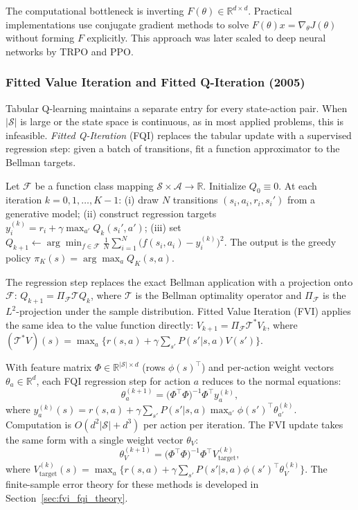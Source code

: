 The computational bottleneck is inverting $F(\theta) \in \mathbb{R}^{d \times d}$. Practical implementations use conjugate gradient methods to solve $F(\theta) x = \nabla_\theta J(\theta)$ without forming $F$ explicitly. This approach was later scaled to deep neural networks by TRPO and PPO.

\subsubsection{Fitted Value Iteration and Fitted Q-Iteration (2005)}
\label{sec:fvi_fqi_algorithms}

Tabular Q-learning maintains a separate entry for every state-action pair. When $|\mathcal{S}|$ is large or the state space is continuous, as in most applied problems, this is infeasible. \emph{Fitted Q-Iteration} (FQI) \citep{Ernst2005} replaces the tabular update with a supervised regression step: given a batch of transitions, fit a function approximator to the Bellman targets.

Let $\mathcal{F}$ be a function class mapping $\mathcal{S} \times \mathcal{A} \to \mathbb{R}$.\label{def:fqi} Initialize $Q_0 \equiv 0$. At each iteration $k = 0, 1, \ldots, K-1$: (i) draw $N$ transitions $(s_i, a_i, r_i, s_i')$ from a generative model; (ii) construct regression targets $y_i^{(k)} = r_i + \gamma \max_{a'} Q_k(s_i', a')$; (iii) set $Q_{k+1} \leftarrow \arg\min_{f \in \mathcal{F}} \frac{1}{N} \sum_{i=1}^N \bigl( f(s_i, a_i) - y_i^{(k)} \bigr)^2$. The output is the greedy policy $\pi_K(s) = \arg\max_a Q_K(s,a)$.

The regression step replaces the exact Bellman application with a projection onto $\mathcal{F}$: $Q_{k+1} = \Pi_{\mathcal{F}} \mathcal{T} Q_k$, where $\mathcal{T}$ is the Bellman optimality operator and $\Pi_{\mathcal{F}}$ is the $L^2$-projection under the sample distribution. Fitted Value Iteration (FVI) \citep{MunosSzepesvari2008} applies the same idea to the value function directly: $V_{k+1} = \Pi_{\mathcal{F}} \mathcal{T}^* V_k$, where $(\mathcal{T}^* V)(s) = \max_a \{ r(s,a) + \gamma \sum_{s'} P(s'|s,a) V(s') \}$.

With feature matrix $\Phi \in \mathbb{R}^{|\mathcal{S}| \times d}$ (rows $\phi(s)^\top$) and per-action weight vectors $\theta_a \in \mathbb{R}^d$, each FQI regression step for action $a$ reduces to the normal equations:
\begin{equation}
\theta_a^{(k+1)} = \bigl(\Phi^\top \Phi\bigr)^{-1} \Phi^\top y_a^{(k)},
\label{eq:fqi_normal}
\end{equation}
where $y_a^{(k)}(s) = r(s,a) + \gamma \sum_{s'} P(s'|s,a) \max_{a'} \phi(s')^\top \theta_{a'}^{(k)}$. Computation is $O(d^2 |\mathcal{S}| + d^3)$ per action per iteration. The FVI update takes the same form with a single weight vector $\theta_V$:
\begin{equation}
\theta_V^{(k+1)} = \bigl(\Phi^\top \Phi\bigr)^{-1} \Phi^\top V_{\mathrm{target}}^{(k)},
\label{eq:fvi_normal}
\end{equation}
where $V_{\mathrm{target}}^{(k)}(s) = \max_a \bigl\{ r(s,a) + \gamma \sum_{s'} P(s'|s,a) \phi(s')^\top \theta_V^{(k)} \bigr\}$. The finite-sample error theory for these methods is developed in Section~\ref{sec:fvi_fqi_theory}.

